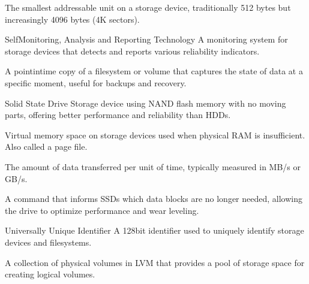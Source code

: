 \documentclass[letterpaper,10pt,english]{sphinxmanual}
\begin{document}
\begin{description}
\sphinxAtStartPar
The smallest addressable unit on a storage device, traditionally 512 bytes but increasingly 4096 bytes (4K sectors).

\sphinxAtStartPar
Self\sphinxhyphen{}Monitoring, Analysis and Reporting Technology \sphinxhyphen{} A monitoring system for storage devices that detects and reports various reliability indicators.

\sphinxAtStartPar
A point\sphinxhyphen{}in\sphinxhyphen{}time copy of a filesystem or volume that captures the state of data at a specific moment, useful for backups and recovery.

\sphinxAtStartPar
Solid State Drive \sphinxhyphen{} Storage device using NAND flash memory with no moving parts, offering better performance and reliability than HDDs.

\sphinxAtStartPar
Virtual memory space on storage devices used when physical RAM is insufficient. Also called a page file.

\sphinxAtStartPar
The amount of data transferred per unit of time, typically measured in MB/s or GB/s.

\sphinxAtStartPar
A command that informs SSDs which data blocks are no longer needed, allowing the drive to optimize performance and wear leveling.

\sphinxAtStartPar
Universally Unique Identifier \sphinxhyphen{} A 128\sphinxhyphen{}bit identifier used to uniquely identify storage devices and filesystems.

\sphinxAtStartPar
A collection of physical volumes in LVM that provides a pool of storage space for creating logical volumes.


\end{description}
\end{document}
